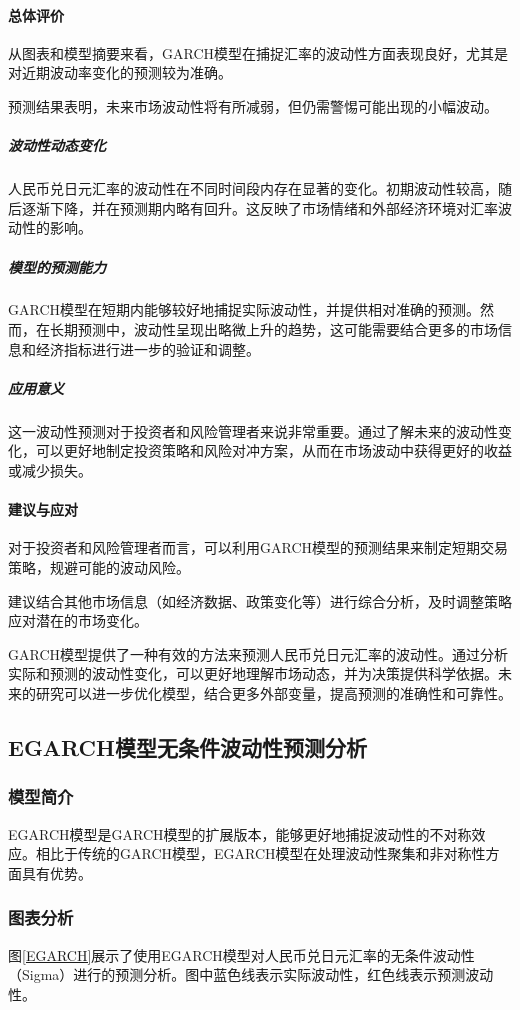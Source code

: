 \paragraph{总体评价}
从图表和模型摘要来看，GARCH模型在捕捉汇率的波动性方面表现良好，尤其是对近期波动率变化的预测较为准确。

预测结果表明，未来市场波动性将有所减弱，但仍需警惕可能出现的小幅波动。
\subparagraph{波动性动态变化}人民币兑日元汇率的波动性在不同时间段内存在显著的变化。初期波动性较高，随后逐渐下降，并在预测期内略有回升。这反映了市场情绪和外部经济环境对汇率波动性的影响。
\subparagraph{模型的预测能力}GARCH模型在短期内能够较好地捕捉实际波动性，并提供相对准确的预测。然而，在长期预测中，波动性呈现出略微上升的趋势，这可能需要结合更多的市场信息和经济指标进行进一步的验证和调整。
\subparagraph{应用意义}这一波动性预测对于投资者和风险管理者来说非常重要。通过了解未来的波动性变化，可以更好地制定投资策略和风险对冲方案，从而在市场波动中获得更好的收益或减少损失。

\paragraph{建议与应对}
对于投资者和风险管理者而言，可以利用GARCH模型的预测结果来制定短期交易策略，规避可能的波动风险。

建议结合其他市场信息（如经济数据、政策变化等）进行综合分析，及时调整策略应对潜在的市场变化。

GARCH模型提供了一种有效的方法来预测人民币兑日元汇率的波动性。通过分析实际和预测的波动性变化，可以更好地理解市场动态，并为决策提供科学依据。未来的研究可以进一步优化模型，结合更多外部变量，提高预测的准确性和可靠性。

\subsection{EGARCH模型无条件波动性预测分析}
\subsubsection{模型简介}
EGARCH模型是GARCH模型的扩展版本，能够更好地捕捉波动性的不对称效应。相比于传统的GARCH模型，EGARCH模型在处理波动性聚集和非对称性方面具有优势。

\subsubsection{图表分析}
图\ref{EGARCH}展示了使用EGARCH模型对人民币兑日元汇率的无条件波动性（Sigma）进行的预测分析。图中蓝色线表示实际波动性，红色线表示预测波动性。

